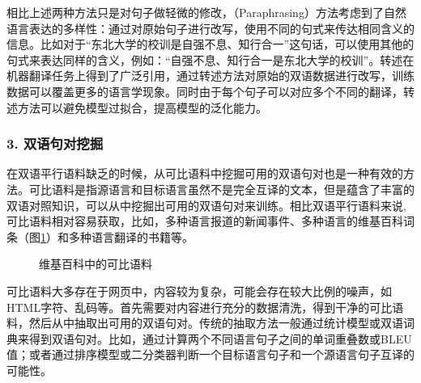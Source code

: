 \parinterval 相比上述两种方法只是对句子做轻微的修改，{\small{}}（Paraphrasing）方法考虑到了自然语言表达的多样性：通过对原始句子进行改写，使用不同的句式来传达相同含义的信息。比如对于“东北大学的校训是自强不息、知行合一”这句话，可以使用其他的句式来表达同样的含义，例如：“自强不息、知行合一是东北大学的校训”。转述在机器翻译任务上得到了广泛引用，通过转述方法对原始的双语数据进行改写，训练数据可以覆盖更多的语言学现象。同时由于每个句子可以对应多个不同的翻译，转述方法可以避免模型过拟合，提高模型的泛化能力。

\subsubsection{3. 双语句对挖掘}

\parinterval 在双语平行语料缺乏的时候，从可比语料中挖掘可用的双语句对也是一种有效的方法。可比语料是指源语言和目标语言虽然不是完全互译的文本，但是蕴含了丰富的双语对照知识，可以从中挖掘出可用的双语句对来训练。相比双语平行语料来说,可比语料相对容易获取，比如，多种语言报道的新闻事件、多种语言的维基百科词条（图\ref{fig:16-4}）和多种语言翻译的书籍等。

\begin{figure}[htp]
    \centering
    
    \caption{维基百科中的可比语料}
    \label{fig:16-4}
\end{figure}

\parinterval 可比语料大多存在于网页中，内容较为复杂，可能会存在较大比例的噪声，如HTML字符、乱码等。首先需要对内容进行充分的数据清洗，得到干净的可比语料，然后从中抽取出可用的双语句对。传统的抽取方法一般通过统计模型或双语词典来得到双语句对。比如，通过计算两个不同语言句子之间的单词重叠数或BLEU值；或者通过排序模型或二分类器判断一个目标语言句子和一个源语言句子互译的可能性。

